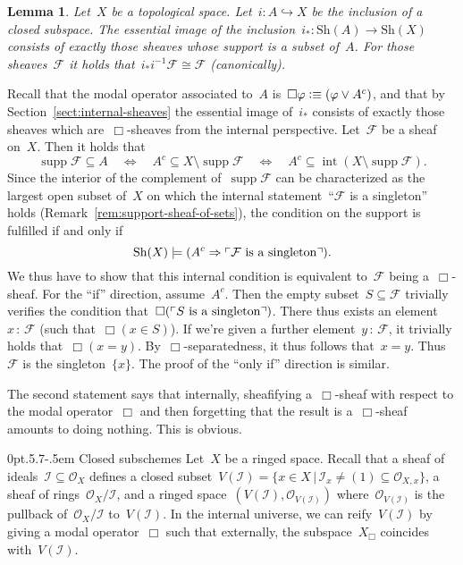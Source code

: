 \documentclass[10pt,reqno,a4paper]{amsbook}
\makeatletter
\theoremstyle{definition}
\theoremstyle{plain}
\newtheorem{lemma}[defn]{Lemma}
\theoremstyle{remark}
\newcommand{\F}{\mathcal{F}}
\renewcommand{\O}{\mathcal{O}}
\newcommand{\I}{\mathcal{I}}
\newcommand{\Sh}{\mathrm{Sh}}
\DeclareMathOperator{\Int}{int}
\DeclareMathOperator{\supp}{supp}
\newcommand{\?}{\,{:}\,}
\renewcommand{\_}{\mathpunct{.}\,}
\newcommand{\speak}[1]{\ulcorner\text{\textnormal{#1}}\urcorner}
\newcommand{\defequiv}{\vcentcolon\equiv}
\renewenvironment{proof}[1][\proofname]{\par
  \pushQED{\qed}%
  \normalfont \topsep6\p@\@plus6\p@\relax
  \trivlist
  \item[\hskip\labelsep
        \itshape
    #1\@addpunct{.}]\ignorespaces
}{%
  \popQED\endtrivlist\@endpefalse
}
\def\subsection{\@startsection{subsection}{2}%
  {0pt}{.5\linespacing\@plus.7\linespacing}{-.5em}%
  {\normalfont\bfseries}}
\makeatother
\begin{document}
\begin{lemma}\label{lemma:essim-closed-immersion}
Let~$X$ be a topological space. Let~$i : A \hookrightarrow X$ be the inclusion
of a closed subspace. The essential image of the
inclusion~$i_* : \Sh(A) \to \Sh(X)$ consists of exactly those sheaves whose support
is a subset of~$A$. For those sheaves~$\F$ it holds that~$i_* i^{-1} \F \cong \F$
(canonically).\end{lemma}
\begin{proof}Recall that the modal operator associated to~$A$ is~$\Box\varphi
\defequiv (\varphi \vee A^c)$, and that by Section~\ref{sect:internal-sheaves} the
essential image of~$i_*$ consists of exactly those sheaves which
are~$\Box$-sheaves from the internal perspective. Let~$\F$ be a sheaf on~$X$.
Then it holds that
\[ \supp\F \subseteq A \quad\Longleftrightarrow\quad
  A^c \subseteq X \setminus \supp\F \quad\Longleftrightarrow\quad
  A^c \subseteq \Int(X \setminus \supp\F). \]
Since the interior of the complement of~$\supp\F$ can be characterized as the
largest open subset of~$X$ on which the internal statement~``$\F$ is a
singleton'' holds (Remark~\ref{rem:support-sheaf-of-sets}), the condition on
the support is fulfilled if and only if
\[ \Sh(X) \models (A^c \Rightarrow \speak{$\F$ is a singleton}). \]
We thus have to show that this internal condition is equivalent to~$\F$ being
a~$\Box$-sheaf. For the ``if'' direction, assume~$A^c$. Then the empty subset~$S
\subseteq \F$ trivially verifies the condition that~$\Box(\speak{$S$ is a
singleton})$. There thus exists an element~$x\?\F$ (such that~$\Box(x \in S)$).
If we're given a further element~$y\?\F$, it trivially holds that~$\Box(x =
y)$. By~$\Box$-separatedness, it thus follows that~$x = y$. Thus~$\F$ is the
singleton~$\{x\}$. The proof of the ``only if'' direction is similar.

The second statement says that internally, sheafifying a~$\Box$-sheaf with
respect to the modal operator~$\Box$ and then forgetting that the result is
a~$\Box$-sheaf amounts to doing nothing. This is obvious.
\end{proof}

\subsection{Closed subschemes} Let~$X$ be a ringed space. Recall
that a sheaf of ideals~$\I \subseteq \O_X$ defines a closed subset~$V(\I) = \{ x
\in X \,|\, \I_x \neq (1) \subseteq \O_{X,x} \}$, a sheaf of
rings~$\O_X/\I$, and a ringed space~$(V(\I), \O_{V(\I)})$ where~$\O_{V(\I)}$ is
the pullback of~$\O_X/\I$ to~$V(\I)$. In the internal universe, we can
reify~$V(\I)$ by giving a modal operator~$\Box$ such that externally, the
subspace~$X_\Box$ coincides with~$V(\I)$.
\end{document}
